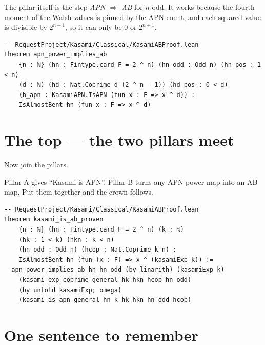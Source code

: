 \documentclass[11pt]{article}
\begin{document}
The pillar itself is the step \emph{APN $\Rightarrow$ AB} for $n$ odd.
It works because the fourth moment of the Walsh values is pinned by the APN
count, and each squared value is divisible by $2^{n+1}$, so it can only be
$0$ or $2^{n+1}$.

\begin{lstlisting}
-- RequestProject/Kasami/Classical/KasamiABProof.lean
theorem apn_power_implies_ab
    {n : ℕ} (hn : Fintype.card F = 2 ^ n) (hn_odd : Odd n) (hn_pos : 1 < n)
    (d : ℕ) (hd : Nat.Coprime d (2 ^ n - 1)) (hd_pos : 0 < d)
    (h_apn : KasamiAPN.IsAPN (fun x : F => x ^ d)) :
    IsAlmostBent hn (fun x : F => x ^ d)
\end{lstlisting}

\section{The top --- the two pillars meet}

Now join the pillars.

Pillar A gives ``Kasami is APN''.
Pillar B turns any APN power map into an AB map.
Put them together and the crown follows.

\begin{center}
\end{center}

\begin{lstlisting}
-- RequestProject/Kasami/Classical/KasamiABProof.lean
theorem kasami_is_ab_proven
    {n : ℕ} (hn : Fintype.card F = 2 ^ n) (k : ℕ)
    (hk : 1 < k) (hkn : k < n)
    (hn_odd : Odd n) (hcop : Nat.Coprime k n) :
    IsAlmostBent hn (fun (x : F) => x ^ (kasamiExp k)) :=
  apn_power_implies_ab hn hn_odd (by linarith) (kasamiExp k)
    (kasami_exp_coprime_general hk hkn hcop hn_odd)
    (by unfold kasamiExp; omega)
    (kasami_is_apn_general hn k hk hkn hn_odd hcop)
\end{lstlisting}

\section{One sentence to remember}
\end{document}
